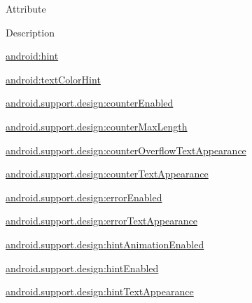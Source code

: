 Attribute

Description 

{\ttfamily \hyperlink{classandroid_1_1support_1_1design_1_1R_1_1styleable_a0b6c36c9dd8175ecc267662c45210acf}{android\+:hint}}

{\ttfamily \hyperlink{classandroid_1_1support_1_1design_1_1R_1_1styleable_a6d956b6c72c2aa19610fc2406c673e22}{android\+:text\+Color\+Hint}}

{\ttfamily \hyperlink{classandroid_1_1support_1_1design_1_1R_1_1styleable_a4c546bc933b45fa150e2148537cf1a2c}{android.\+support.\+design\+:counter\+Enabled}}

{\ttfamily \hyperlink{classandroid_1_1support_1_1design_1_1R_1_1styleable_afce3e6248022ba8506318e081a5e6efb}{android.\+support.\+design\+:counter\+Max\+Length}}

{\ttfamily \hyperlink{classandroid_1_1support_1_1design_1_1R_1_1styleable_a3edf526a4c547c24a4dbce7a67d32646}{android.\+support.\+design\+:counter\+Overflow\+Text\+Appearance}}

{\ttfamily \hyperlink{classandroid_1_1support_1_1design_1_1R_1_1styleable_ad31b5989bc5b2edce56f3e8277c50502}{android.\+support.\+design\+:counter\+Text\+Appearance}}

{\ttfamily \hyperlink{classandroid_1_1support_1_1design_1_1R_1_1styleable_af41f85d64b3b697a4733e3d4aa3d0f38}{android.\+support.\+design\+:error\+Enabled}}

{\ttfamily \hyperlink{classandroid_1_1support_1_1design_1_1R_1_1styleable_a6082781f4ba58bfcd9d7ce5d018a470a}{android.\+support.\+design\+:error\+Text\+Appearance}}

{\ttfamily \hyperlink{classandroid_1_1support_1_1design_1_1R_1_1styleable_a5bcfd0299af354869ae56b7577ec35e9}{android.\+support.\+design\+:hint\+Animation\+Enabled}}

{\ttfamily \hyperlink{classandroid_1_1support_1_1design_1_1R_1_1styleable_a164a51b99de4318938aea1e4cb2252a1}{android.\+support.\+design\+:hint\+Enabled}}

{\ttfamily \hyperlink{classandroid_1_1support_1_1design_1_1R_1_1styleable_a2598a54f9e9d2a6238931ce0ae9b6bcc}{android.\+support.\+design\+:hint\+Text\+Appearance}}

